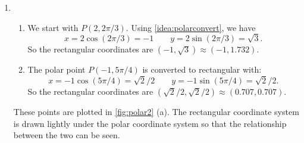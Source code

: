 {\begin{enumerate}
	\item \begin{enumerate}
		\item 
	We start with $P(2,2\pi/3)$. Using \autoref{idea:polarconvert}, we have 
	$$x= 2\cos (2\pi/3) = -1\qquad y = 2\sin (2\pi/3) = \sqrt{3}.$$
	So the rectangular coordinates are $(-1,\sqrt{3}) \approx (-1,1.732)$.
	
	\item The polar point $P(-1,5\pi/4)$ is converted to rectangular with:
	$$x=-1\cos (5\pi/4) = \sqrt{2}/2\qquad y= -1\sin (5\pi/4) = \sqrt{2}/2.$$
	So the rectangular coordinates are $(\sqrt{2}/2,\sqrt{2}/2) \approx (0.707,0.707)$.
	\end{enumerate}
	These points are plotted in \autoref{fig:polar2} (a). The rectangular coordinate system is drawn lightly under the polar coordinate system so that the relationship between the two can be seen.
	


\end{enumerate}}
